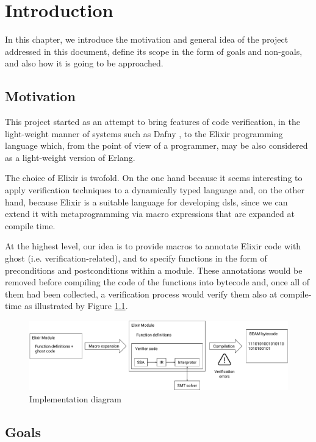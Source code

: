 \chapter{Introduction}
\label{cap:introduction}

In this chapter, we introduce the motivation and general idea of the project
addressed in this document, define its scope in the form of goals and non-goals,
and also how it is going to be approached.

\section{Motivation}

This project started as an attempt to bring features of code verification, in
the light-weight manner of systems such as Dafny \citep{DafnyManual}, to the
Elixir programming language which, from the point of view of a programmer, may
be also considered as a light-weight version of Erlang.

The choice of Elixir is twofold. On the one hand because it seems interesting to
apply verification techniques to a dynamically typed language and, on the other
hand, because Elixir is a suitable language for developing \gls{dsl}s, since we
can extend it with metaprogramming via macro expressions that are expanded at
compile time.

At the highest level, our idea is to provide macros to annotate Elixir code with
ghost (i.e. verification-related), and to specify functions in the form of
preconditions and postconditions within a module. These annotations would be
removed before compiling the code of the functions into bytecode and, once all
of them had been collected, a verification process would verify them also at
compile-time as illustrated by Figure \ref{fig:diag}.

\begin{figure}[h]
\includegraphics[width=\textwidth]{Images/Vectorial/Diagram}
\caption{Implementation diagram}
\label{fig:diag}
\end{figure}

\section{Goals}

